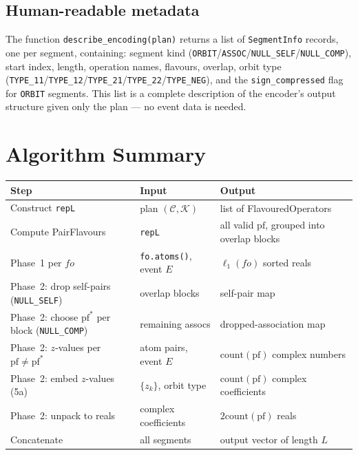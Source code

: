\documentclass[11pt,a4paper]{article}
\theoremstyle{definition}
\theoremstyle{plain}
\theoremstyle{remark}
\newcommand{\pf}{\mathrm{pf}}
\newcommand{\acount}{\mathrm{count}}
\begin{document}
\subsection{Human-readable metadata}

The function \texttt{describe\_encoding(plan)} returns a list of
\texttt{SegmentInfo} records, one per segment, containing: segment kind
(\texttt{ORBIT}/\texttt{ASSOC}/\texttt{NULL\_SELF}/\texttt{NULL\_COMP}),
start index, length, operation names, flavours, overlap, orbit type
(\texttt{TYPE\_11}/\texttt{TYPE\_12}/\texttt{TYPE\_21}/\texttt{TYPE\_22}/\texttt{TYPE\_NEG}),
and the \texttt{sign\_compressed} flag for \texttt{ORBIT} segments.  This list
is a complete description of the encoder's output structure given only the
plan — no event data is needed.

\section{Algorithm Summary}

\begin{center}
\renewcommand{\arraystretch}{1.5}
\begin{tabular}{lll}
  \toprule
  \textbf{Step} & \textbf{Input} & \textbf{Output} \\
  \midrule
  Construct \texttt{repL} & plan $(\mathcal{C}, \mathcal{K})$
    & list of FlavouredOperators \\
  Compute PairFlavours & \texttt{repL}
    & all valid $\pf$, grouped into overlap blocks \\
  \midrule
  Phase~1 per $\mathit{fo}$
    & \texttt{fo.atoms()}, event $E$
    & $\ell_1(\mathit{fo})$ sorted reals \\
  \midrule
  Phase~2: drop self-pairs (\texttt{NULL\_SELF}) & overlap blocks & self-pair map \\
  Phase~2: choose $\pf^*$ per block (\texttt{NULL\_COMP}) & remaining assocs & dropped-association map \\
  Phase~2: $z$-values per $\pf \ne \pf^*$
    & atom pairs, event $E$
    & $\acount(\pf)$ complex numbers \\
  Phase~2: embed $z$-values (5a)
    & $\{z_k\}$, orbit type
    & $\acount(\pf)$ complex coefficients \\
  Phase~2: unpack to reals
    & complex coefficients
    & $2\acount(\pf)$ reals \\
  \midrule
  Concatenate & all segments & output vector of length $L$ \\
  \bottomrule
\end{tabular}
\end{center}
\end{document}
